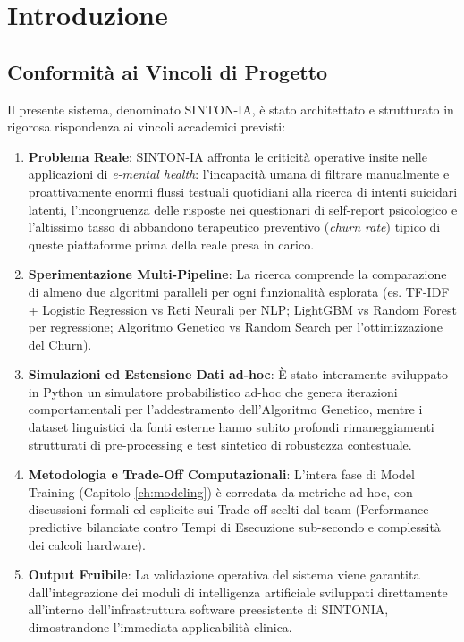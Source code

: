 \chapter{Introduzione}
\label{ch:introduzione}

\section{Conformità ai Vincoli di Progetto}
\label{sec:vincoli_progetto}
Il presente sistema, denominato SINTON-IA, è stato architettato e strutturato in rigorosa rispondenza ai vincoli accademici previsti:
\begin{enumerate}
    \item \textbf{Problema Reale}: SINTON-IA affronta le criticità operative insite nelle applicazioni di \textit{e-mental health}: l'incapacità umana di filtrare manualmente e proattivamente enormi flussi testuali quotidiani alla ricerca di intenti suicidari latenti, l'incongruenza delle risposte nei questionari di self-report psicologico e l'altissimo tasso di abbandono terapeutico preventivo (\textit{churn rate}) tipico di queste piattaforme prima della reale presa in carico.
    \item \textbf{Sperimentazione Multi-Pipeline}: La ricerca comprende la comparazione di almeno due algoritmi paralleli per ogni funzionalità esplorata (es. TF-IDF + Logistic Regression vs Reti Neurali per NLP; LightGBM vs Random Forest per regressione; Algoritmo Genetico vs Random Search per l'ottimizzazione del Churn).
    \item \textbf{Simulazioni ed Estensione Dati ad-hoc}: È stato interamente sviluppato in Python un simulatore probabilistico ad-hoc che genera iterazioni comportamentali per l'addestramento dell'Algoritmo Genetico, mentre i dataset linguistici da fonti esterne hanno subito profondi rimaneggiamenti strutturati di pre-processing e test sintetico di robustezza contestuale.
    \item \textbf{Metodologia e Trade-Off Computazionali}: L'intera fase di Model Training (Capitolo \ref{ch:modeling}) è corredata da metriche ad hoc, con discussioni formali ed esplicite sui Trade-off scelti dal team (Performance predictive bilanciate contro Tempi di Esecuzione sub-secondo e complessità dei calcoli hardware).
    \item \textbf{Output Fruibile}: La validazione operativa del sistema viene garantita dall'integrazione dei moduli di intelligenza artificiale sviluppati direttamente all'interno dell'infrastruttura software preesistente di SINTONIA, dimostrandone l'immediata applicabilità clinica.
\end{enumerate}

